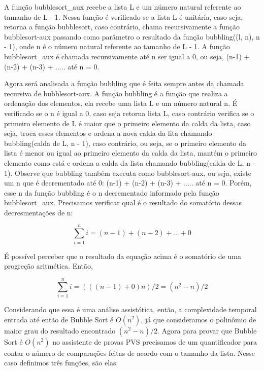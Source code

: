 \documentclass[12pt]{article}
\begin{document}
A função bubblesort\_aux recebe a lista L e um número natural referente ao tamanho de L - 1. Nessa função é verificado se a lista L é unitária, caso seja, retorna a função bubblesort, caso contrário, chama recursivamente a função bubblesort-aux passando como parâmetro o resultado da função bubbling((l, n), n - 1), onde n é o número natural referente ao tamanho de L - 1. A função bubblesort\_aux é chamada recursivamente até n ser igual a 0, ou seja, (n-1) + (n-2) + (n-3) + ..... até n = 0.

Agora será analisada a função bubbling que é feita sempre antes da chamada recursiva de bubblesort-aux. A função bubbling é a função que realiza a ordenação dos elementos, ela recebe uma lista L e um número natural n. É verificado se o n é igual a 0, caso seja retorna lista L, caso contrário verifica se o primeiro elemento de L é maior que o primeiro elemento da calda da lista, caso seja, troca esses elementos e ordena a nova calda da lita chamando bubbling(calda de L, n - 1), caso contrário, ou seja, se o primeiro elemento da lista é menor ou igual ao primeiro elemento da calda da lista, mantém o primeiro elemento como está e ordena a calda da lista chamando bubbling(calda de L, n - 1). Observe que bubbling também executa como bubblesort-aux, ou seja, existe um n que é decrementado até 0: (n-1) + (n-2) + (n-3) + ..... até n = 0. Porém, esse n da função bubbling é o n decrementado informado pela função bubblesort\_aux. Precisamos verificar qual é o resultado do somatório dessas decresmentações de n:

\begin{equation}
    \sum_{i=1}^{n} i = (n - 1) + (n - 2) + ... + 0	
\end{equation}

É possível perceber que o resultado da equação acima é o somatório de uma progreção aritmética. Então, 

\begin{equation}
    \sum_{i=1}^{n} i = (((n - 1) + 0)n)/2 = (n^{2} - n)/2
\end{equation}

Considerando que essa é uma análise assistótica, então, a complexidade temporal entrada até então de Bubble Sort é $O(n^2)$, já que consideramos o polinômio de maior grau do resultado encontrado $(n^{2} - n)/2$.
\newpage
Agora para provar que Bubble Sort é $O(n^2)$ no assistente de provas PVS precisamos de um quantificador para contar o número de comparações feitas de acordo com o tamanho da lista. Nesse caso definimos três funções, são elas: 
\end{document}
